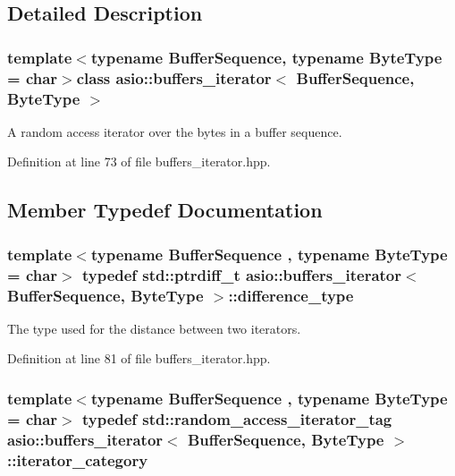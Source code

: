 \subsection{Detailed Description}
\subsubsection*{template$<$typename Buffer\+Sequence, typename Byte\+Type = char$>$class asio\+::buffers\+\_\+iterator$<$ Buffer\+Sequence, Byte\+Type $>$}

A random access iterator over the bytes in a buffer sequence. 

Definition at line 73 of file buffers\+\_\+iterator.\+hpp.



\subsection{Member Typedef Documentation}
\hypertarget{classasio_1_1buffers__iterator_a959fca11c49c2ecb423eb22ccad8062b}{}
\subsubsection[{difference\+\_\+type}]{\setlength{\rightskip}{0pt plus 5cm}template$<$typename Buffer\+Sequence , typename Byte\+Type  = char$>$ typedef std\+::ptrdiff\+\_\+t {\bf asio\+::buffers\+\_\+iterator}$<$ Buffer\+Sequence, Byte\+Type $>$\+::{\bf difference\+\_\+type}}\label{classasio_1_1buffers__iterator_a959fca11c49c2ecb423eb22ccad8062b}


The type used for the distance between two iterators. 



Definition at line 81 of file buffers\+\_\+iterator.\+hpp.

\hypertarget{classasio_1_1buffers__iterator_a259930bc88ee38a9e9bf9e65aa06dd8c}{}
\subsubsection[{iterator\+\_\+category}]{\setlength{\rightskip}{0pt plus 5cm}template$<$typename Buffer\+Sequence , typename Byte\+Type  = char$>$ typedef std\+::random\+\_\+access\+\_\+iterator\+\_\+tag {\bf asio\+::buffers\+\_\+iterator}$<$ Buffer\+Sequence, Byte\+Type $>$\+::{\bf iterator\+\_\+category}}\label{classasio_1_1buffers__iterator_a259930bc88ee38a9e9bf9e65aa06dd8c}


